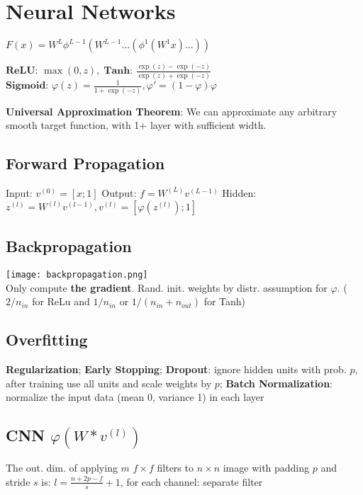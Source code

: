 \section*{Neural Networks}

$F(x)=W^{L}\phi^{L-1}(W^{L-1}...(\phi^{1}(W^{1}x)...))$

$\textbf{ReLU: } \max (0,z), \; \textbf{Tanh: } \frac{\exp(z) - \exp(-z)}{\exp(z) + \exp(-z)}$ \\[-3pt]
$\textbf{Sigmoid: } \varphi(z) = \frac{1}{1 + \exp(-z)}, \varphi' = (1 - \varphi) \varphi$


\textbf{Universal Approximation Theorem}: We can approximate any arbitrary smooth target function, with 1+ layer with sufficient width.

\subsection*{Forward Propagation}

Input: $v^{(0)} = [x; 1]$ \quad Output: $f = W^{(L)} v^{(L-1)}$
Hidden: $z^{(l)} = W^{(l)} v^{(l-1)}, v^{(l)} = [\varphi(z^{(l)}); 1]$


\subsection*{Backpropagation}

\texttt{[image: backpropagation.png]} \\[-15pt]

Only compute \color{Red} \textbf{the gradient}\color{Black}. Rand. init. weights by distr. assumption for $\varphi$. ( $2 / n_{in}$ for ReLu and $1/n_{in}$ or $ 1/ (n_{in} + n_{out})$ for Tanh)

\subsection*{Overfitting}
\textbf{Regularization}; \textbf{Early Stopping}; \textbf{Dropout}: ignore hidden units with prob. $p$, after training use all units and scale weights by $p$; \textbf{Batch Normalization}: normalize the input data (mean 0, variance 1) in each layer

\subsection*{CNN \quad \color{Black}$\varphi(W * v^{(l)})$}

The out. dim. of applying $m$ $f \times f$ filters to $n \times n$ image with padding $p$ and stride $s$ is: $l = \frac{n + 2p - f}{s} + 1$, for each channel: separate filter
